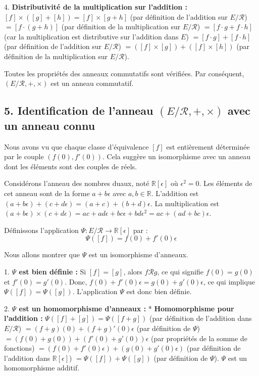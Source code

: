 \documentclass{report}
\begin{document}
    4.  \textbf{Distributivité de la multiplication sur l'addition :}
        $[f] \times ([g] + [h]) = [f] \times [g+h]$ (par définition de l'addition sur $E/\mathcal{R}$)
        $= [f \cdot (g+h)]$ (par définition de la multiplication sur $E/\mathcal{R}$)
        $= [f \cdot g + f \cdot h]$ (car la multiplication est distributive sur l'addition dans $E$)
        $= [f \cdot g] + [f \cdot h]$ (par définition de l'addition sur $E/\mathcal{R}$)
        $= ([f] \times [g]) + ([f] \times [h])$ (par définition de la multiplication sur $E/\mathcal{R}$).

Toutes les propriétés des anneaux commutatifs sont vérifiées. Par conséquent, $(E/\mathcal{R}, +, \times)$ est un anneau commutatif.

\subsection*{5. Identification de l'anneau $(E/\mathcal{R}, +, \times)$ avec un anneau connu}

Nous avons vu que chaque classe d'équivalence $[f]$ est entièrement déterminée par le couple $(f(0), f'(0))$. Cela suggère un isomorphisme avec un anneau dont les éléments sont des couples de réels.

Considérons l'anneau des nombres duaux, noté $\mathbb{R}[\epsilon]$ où $\epsilon^2 = 0$. Les éléments de cet anneau sont de la forme $a + b\epsilon$ avec $a, b \in \mathbb{R}$.
L'addition est $(a+b\epsilon) + (c+d\epsilon) = (a+c) + (b+d)\epsilon$.
La multiplication est $(a+b\epsilon) \times (c+d\epsilon) = ac + ad\epsilon + bc\epsilon + bd\epsilon^2 = ac + (ad+bc)\epsilon$.

Définissons l'application $\Psi : E/\mathcal{R} \to \mathbb{R}[\epsilon]$ par :
$$\Psi([f]) = f(0) + f'(0)\epsilon$$

Nous allons montrer que $\Psi$ est un isomorphisme d'anneaux.

1.  \textbf{$\Psi$ est bien définie :}
    Si $[f] = [g]$, alors $f \mathcal{R} g$, ce qui signifie $f(0) = g(0)$ et $f'(0) = g'(0)$.
    Donc, $f(0) + f'(0)\epsilon = g(0) + g'(0)\epsilon$, ce qui implique $\Psi([f]) = \Psi([g])$.
    L'application $\Psi$ est donc bien définie.

2.  \textbf{$\Psi$ est un homomorphisme d'anneaux :}
    *   \textbf{Homomorphisme pour l'addition :}
        $\Psi([f] + [g]) = \Psi([f+g])$ (par définition de l'addition dans $E/\mathcal{R}$)
        $= (f+g)(0) + (f+g)'(0)\epsilon$ (par définition de $\Psi$)
        $= (f(0)+g(0)) + (f'(0)+g'(0))\epsilon$ (par propriétés de la somme de fonctions)
        $= (f(0) + f'(0)\epsilon) + (g(0) + g'(0)\epsilon)$ (par définition de l'addition dans $\mathbb{R}[\epsilon]$)
        $= \Psi([f]) + \Psi([g])$ (par définition de $\Psi$).
        $\Psi$ est un homomorphisme additif.
\end{document}
